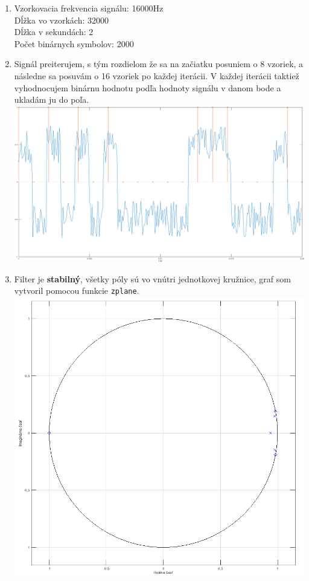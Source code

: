 \documentclass[a4paper,12pt,twocolumn]{article}
\begin{document}
\begin{enumerate}
\item
Vzorkovacia frekvencia signálu: 16000Hz\\
Dĺžka vo vzorkách: 32000\\
Dĺžka v sekundách: 2\\
Počet binárnych symbolov: 2000
\item
Signál preiterujem, s tým rozdielom že sa na začiatku posuniem o 8 vzoriek, a následne sa posuvám o 16 vzoriek po každej iterácii. V každej iterácii taktiež vyhodnocujem binárnu hodnotu podľa hodnoty signálu v danom bode a ukladám ju do poľa.
\includegraphics[width=\linewidth]{2}
\item
Filter je \textbf{stabilný}, všetky póly sú vo vnútri jednotkovej kružnice, graf som vytvoril pomocou funkcie \texttt{zplane}.
\includegraphics[width=\linewidth]{3}

\end{enumerate}
\end{document}

